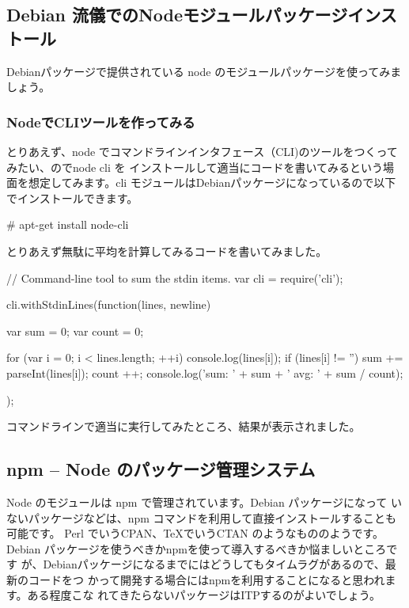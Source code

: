 \documentclass[mingoth,a4paper]{jsarticle}
\begin{document}
\subsection{Debian 流儀でのNodeモジュールパッケージインストール}

Debianパッケージで提供されている node のモジュールパッケージを使ってみましょう。

\subsubsection{NodeでCLIツールを作ってみる}

とりあえず、node でコマンドラインインタフェース（CLI)のツールをつくってみたい、のでnode cli を
インストールして適当にコードを書いてみるという場面を想定してみます。cli
モジュールはDebianパッケージになっているので以下でインストールできます。

\begin{commandline}
# apt-get install node-cli
\end{commandline}

とりあえず無駄に平均を計算してみるコードを書いてみました。

\begin{commandline}
// Command-line tool to sum the stdin items.
var cli = require('cli');

cli.withStdinLines(function(lines, newline) {
    var sum = 0;
    var count = 0;

    for (var i = 0; i < lines.length; ++i) {
	console.log(lines[i]);
	if (lines[i] != '') {
	    sum += parseInt(lines[i]);
	    count ++;
	}
    }
    console.log('sum: ' + sum + ' avg: ' + sum / count);
});
\end{commandline}

コマンドラインで適当に実行してみたところ、結果が表示されました。

\subsection{npm -- Node のパッケージ管理システム}

Node のモジュールは npm で管理されています。Debian パッケージになって
いないパッケージなどは、npm コマンドを利用して直接インストールすることも可能です。
Perl でいうCPAN、TeXでいうCTAN のようなもののようです。
Debian パッケージを使うべきかnpmを使って導入するべきか悩ましいところです
が、Debianパッケージになるまでにはどうしてもタイムラグがあるので、最新のコードをつ
かって開発する場合にはnpmを利用することになると思われます。ある程度こな
れてきたらないパッケージはITPするのがよいでしょう。
\end{document}
